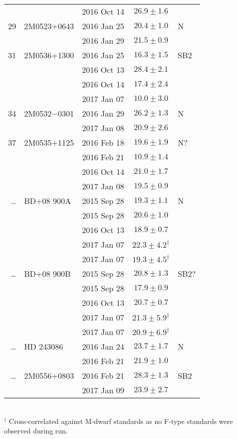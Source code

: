 \documentclass[usenatbib]{mnras}
\begin{document}
\begin{table}
\begin{flushleft}
\begin{tabular}{r l c c l}
& & 2016 Oct 14 &	$26.9\pm	1.6$\\[2mm]
29 & 2M0523+0643 & 2016 Jan 25 &	$20.4\pm	1.0$ & N\\
& & 2016 Jan 29 &	$21.5\pm	0.9$\\[2mm]
31 & 2M0536+1300 & 2016 Jan 25 &	$16.3\pm	1.5$ & SB2\\
& & 2016 Oct 13 & $28.4\pm	2.1$\\
& & 2016 Oct 14 &	$17.4\pm2.4$\\
& & 2017 Jan 07 &	$10.0\pm	3.0$\\[2mm]
34 & 2M0532$-$0301	&2016 Jan 29 & $26.2\pm	1.3$ & N\\
& & 2017 Jan 08 & 	$20.9\pm 2.6$\\[2mm]
37 & 2M0535+1125  &  2016 Feb 18 & $19.6\pm	1.9$ & N?\\
& & 2016 Feb 21&	$10.9\pm	1.4$\\
& & 2016 Oct 14 &	$21.0\pm	1.7$\\
& & 2017 Jan 08 & $	19.5\pm	0.9$\\[2mm]
\dots & BD+08 900A & 2015 Sep 28 & $19.3\pm	1.1$ & N\\
& & 2015 Sep 28 &	$20.6\pm	1.0$\\
& & 2016 Oct 13 & $18.9\pm0.7$\\
& & 2017 Jan 07 & $22.3\pm4.2^{\dagger}$\\
& & 2017 Jan 07 & $19.3\pm4.5^{\dagger}$\\[2mm]
\dots& BD+08 900B & 2015 Sep 28 & $20.8\pm	1.3$ & SB2?\\
& & 2015 Sep 28 &	$17.9\pm	0.9$\\
& & 2016 Oct 13 & $20.7\pm0.7$\\
& & 2017 Jan 07 & $21.3\pm 5.9^{\dagger}$\\
& & 2017 Jan 07 & $20.9\pm 6.9^{\dagger}$\\[2mm]
\dots& HD 243086 & 2016 Jan 24 &	$23.7\pm	1.7$ & N\\
& & 2016 Feb 21 &	$21.9\pm	1.0$\\[2mm]
\dots& 2M0556+0803	& 2016 Feb 21 &$28.3\pm	1.3$ & SB2\\
& & 2017 Jan 09 & $23.9\pm	2.7$\\
\hline
\end{tabular}\\
$^{\dagger}$ Cross-correlated against M-dwarf standards as no F-type standards were observed during run.
\end{flushleft}
\end{table}
\end{document}
